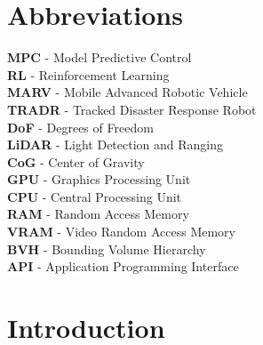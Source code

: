 \documentclass[a4paper,12pt]{article}
\begin{document}
\frontMatter


\section*{Abbreviations}
\label{sec:abbreviations}

\textbf{MPC} - Model Predictive Control \\ 
\textbf{RL} - Reinforcement Learning \\
\textbf{MARV} - Mobile Advanced Robotic Vehicle \\
\textbf{TRADR} - Tracked Disaster Response Robot \\
\textbf{DoF} - Degrees of Freedom \\
\textbf{LiDAR} - Light Detection and Ranging \\
\textbf{CoG} - Center of Gravity \\
\textbf{GPU} - Graphics Processing Unit \\
\textbf{CPU} - Central Processing Unit \\
\textbf{RAM} - Random Access Memory \\
\textbf{VRAM} - Video Random Access Memory \\
\textbf{BVH} - Bounding Volume Hierarchy \\
\textbf{API} - Application Programming Interface \\


\clearpage
\pagestyle{fancy}


\tableofcontents %


\clearpage

\section{Introduction}
\label{sec:introduction}
\end{document}
